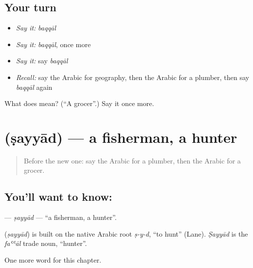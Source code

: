 \subsection*{Your turn}
\begin{itemize}
\raggedright
  \item \emph{Say it:} \emph{baqqāl}
  \item \emph{Say it:} \emph{baqqāl}, once more
  \item \emph{Say it:} say \emph{baqqāl}
  \item \emph{Recall:} say the Arabic for geography, then the Arabic for a plumber, then say \emph{baqqāl} again
\end{itemize}

\begin{tcolorbox}[breakable,colback=teal!4,colframe=teal!35!black,title={Before you move on}]
What does  mean? (\textquotedblleft{}A grocer\textquotedblright{}.) Say it once more.
\end{tcolorbox}
\section[\texorpdfstring{\ar{صياد} (ṣayyād)}{صياد (ṣayyād)}]{ (ṣayyād) — a fisherman, a hunter}

\label{lesson:AR-C191-sayyad}



\begin{quote}
Before the new one: say the Arabic for a plumber, then the Arabic for a grocer.
\end{quote}

\subsection*{You'll want to know: }
\textbf{} — \emph{ṣayyād} — \textquotedblleft{}a fisherman, a hunter\textquotedblright{}.

\begin{cousinweb}
\textbf{} (\emph{ṣayyād}) is built on the native Arabic root \emph{ṣ-y-d}, \textquotedblleft{}to hunt\textquotedblright{} (Lane). \emph{Ṣayyād} is the \emph{faʿʿāl} trade noun, \textquotedblleft{}hunter\textquotedblright{}.
\end{cousinweb}

\begin{grammarlens}[title={What you've built}]
One more word for this chapter.
\end{grammarlens}

